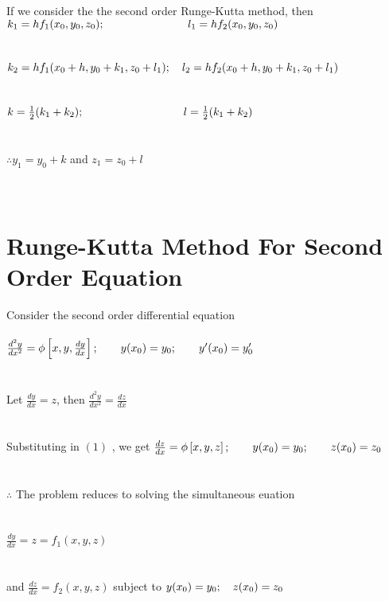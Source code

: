 \documentclass{report}
\begin{document}
			If we consider the the second order Runge-Kutta method, then\\
			\hspace*{4 em}$k_{1} = hf_{1}(x_{0},y_{0},z_{0}); \hspace*{7.5 em} l_{1} = hf_{2}(x_{0},y_{0},z_{0})$\\ \\ \\
			\hspace*{4 em}$k_{2} = hf_{1}(x_{0} + h,y_{0} + k _{1},z_{0} + l_{1}); \hspace*{1 em} l_{2} = hf_{2}(x_{0} + h,y_{0} + k_{1},z_{0} + l_{1})$\\ \\ \\
			\hspace*{4 em}$k = \frac{1}{2}(k_{1} + k_{2}); \hspace*{9 em} l = \frac{1}{2}(k_{1} + k_{2})$\\ \\ \\
			$\therefore$\hspace*{4 em}$y_{1} = y_{0} + k$ and $z_{1} = z_{0} + l$\\ \\ \\
		\section{Runge-Kutta Method For Second Order Equation}
			Consider the second order differential equation \\ \\
			\hspace*{10 em} $ \frac{d^2y}{dx^2} = \phi\left[x,y,\frac{dy}{dx}\right]; \hspace*{2 em}y(x_{0}) = y_{0}; \hspace*{2 em}y'(x_{0}) = y'_{0}$\\ \\ \\
			Let $\frac{dy}{dx} = z$, then  $ \frac{d^2y}{dx^2} = \frac{dz}{dx}$\\ \\ \\
			Substituting in $(1)$ , we get $ \frac{dz}{dx} = \phi\left[x,y,z\right]; \hspace*{2 em}y(x_{0}) = y_{0}; \hspace*{2 em}z(x_{0}) = z_{0}$ \\ \\ \\
			$\therefore$ The problem reduces to solving the simultaneous euation \\ \\ \\
			\hspace*{10 em}$\frac{dy}{dx} = z = f_{1}(x, y, z)$ \\ \\ \\
			and \hspace*{10 em}$\frac{dz}{dx} = f_{2}(x, y, z)$ subject to $y(x_{0}) = y_{0}; \hspace*{1 em}z(x_{0}) = z_{0}$ 
\end{document}
